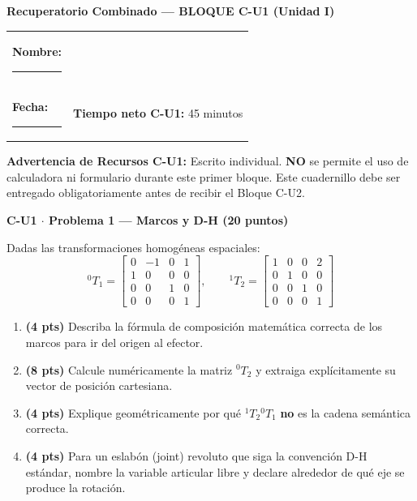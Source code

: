 \documentclass[11pt, a4paper]{article}
\begin{document}

\begin{center}
    \Large\textbf{\textcolor{ucbblue}{Recuperatorio Combinado — BLOQUE C-U1 (Unidad I)}}
\end{center}

\vspace{0.2cm}
\noindent\begin{tabular}{ll}
\textbf{Nombre:} \rule{7cm}{0.15mm} \\
\textbf{Fecha:} \rule{4cm}{0.15mm} & \textbf{Tiempo neto C-U1:} 45 minutos
\end{tabular}

\vspace{0.3cm}
\begin{tcolorbox}[colback=red!5, colframe=red!80!black, left=2mm, right=2mm, top=1mm, bottom=1mm]
    \small\textbf{Advertencia de Recursos C-U1:} Escrito individual. \textbf{NO} se permite el uso de calculadora ni formulario durante este primer bloque. Este cuadernillo debe ser entregado obligatoriamente antes de recibir el Bloque C-U2.
\end{tcolorbox}

\vspace{0.3cm}
\noindent\textbf{\large C-U1 $\cdot$ Problema 1 — Marcos y D-H (20 puntos)}

Dadas las transformaciones homogéneas espaciales:
\begin{equation*}
    {}^0T_1=\begin{bmatrix}0&-1&0&1\\1&0&0&0\\0&0&1&0\\0&0&0&1\end{bmatrix},\qquad
    {}^1T_2=\begin{bmatrix}1&0&0&2\\0&1&0&0\\0&0&1&0\\0&0&0&1\end{bmatrix}
\end{equation*}

\begin{enumerate}
    \item \textbf{(4 pts)} Describa la fórmula de composición matemática correcta de los marcos para ir del origen al efector.
    \item \textbf{(8 pts)} Calcule numéricamente la matriz ${}^0T_2$ y extraiga explícitamente su vector de posición cartesiana.
    \item \textbf{(4 pts)} Explique geométricamente por qué ${}^1T_2{}^0T_1$ \textbf{no} es la cadena semántica correcta.
    \item \textbf{(4 pts)} Para un eslabón (joint) revoluto que siga la convención D-H estándar, nombre la variable articular libre y declare alrededor de qué eje se produce la rotación.
\end{enumerate}
\end{document}
